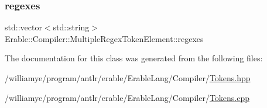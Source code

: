 \mbox{\label{class_erable_1_1_compiler_1_1_multiple_regex_token_element_afa320f00032296ec3da6651b879146cb}} 
\subsubsection{\texorpdfstring{regexes}{regexes}}
{\footnotesize\ttfamily std\+::vector$<$std\+::string$>$ Erable\+::\+Compiler\+::\+Multiple\+Regex\+Token\+Element\+::regexes\hspace{0.3cm}{\ttfamily [private]}}



The documentation for this class was generated from the following files\+:\begin{DoxyCompactItemize}
\item 
/williamye/program/antlr/erable/\+Erable\+Lang/\+Compiler/\mbox{\hyperlink{_tokens_8hpp}{Tokens.\+hpp}}\item 
/williamye/program/antlr/erable/\+Erable\+Lang/\+Compiler/\mbox{\hyperlink{_tokens_8cpp}{Tokens.\+cpp}}\end{DoxyCompactItemize}

